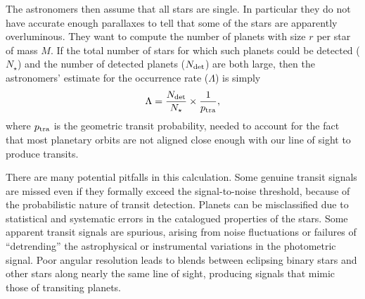 \documentclass[12pt,modern]{aastex61}
\begin{document}
The astronomers then assume that all stars are single.  In particular
they do not have accurate enough parallaxes to tell that some of the
stars are apparently overluminous.  They want to compute the number of
planets with size $r$ per star of mass $M$.  If the total number of
stars for which such planets could be detected ($N_\star$) and the
number of detected planets ($N_{\rm det}$) are both large, then the
astronomers' estimate for the occurrence rate ($\Lambda$) is simply
\begin{equation}
\Lambda = \frac{N_{\rm det}}{N_\star}
                    \times \frac{1}{p_{\rm tra}},
\label{eq:occ_rate_simple}
\end{equation}
where $p_{\rm tra}$ is the geometric transit probability, needed to
account for the fact that most planetary orbits are not aligned close
enough with our line of sight to produce transits.

There are many potential pitfalls in this calculation.  Some genuine
transit signals are missed even if they formally exceed the
signal-to-noise threshold, because of the probabilistic nature of
transit detection.  Planets can be misclassified due to statistical
and systematic errors in the catalogued properties of the stars.  Some
apparent transit signals are spurious, arising from noise fluctuations
or failures of ``detrending'' the astrophysical or instrumental
variations in the photometric signal.  Poor angular resolution leads
to blends between eclipsing binary stars and other stars along nearly
the same line of sight, producing signals that mimic those of
transiting planets.
\end{document}
